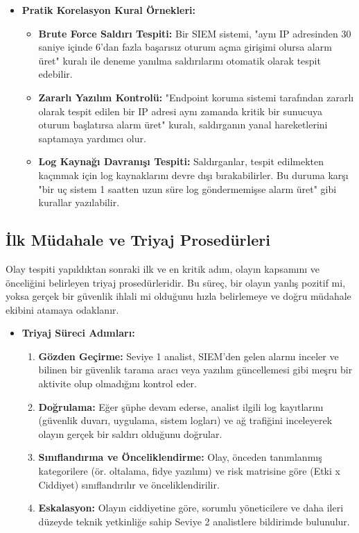 \begin{itemize}
    \item \textbf{Pratik Korelasyon Kural Örnekleri:}
    \begin{itemize}
        \item \textbf{Brute Force Saldırı Tespiti:} Bir SIEM sistemi, "aynı IP adresinden 30 saniye içinde 6'dan fazla başarısız oturum açma girişimi olursa alarm üret" kuralı ile deneme yanılma saldırılarını otomatik olarak tespit edebilir.
        \item \textbf{Zararlı Yazılım Kontrolü:} "Endpoint koruma sistemi tarafından zararlı olarak tespit edilen bir IP adresi aynı zamanda kritik bir sunucuya oturum başlatırsa alarm üret" kuralı, saldırganın yanal hareketlerini saptamaya yardımcı olur.
        \item \textbf{Log Kaynağı Davranışı Tespiti:} Saldırganlar, tespit edilmekten kaçınmak için log kaynaklarını devre dışı bırakabilirler. Bu duruma karşı "bir uç sistem 1 saatten uzun süre log göndermemişse alarm üret" gibi kurallar yazılabilir.
    \end{itemize}
\end{itemize}

\subsection{İlk Müdahale ve Triyaj Prosedürleri}

Olay tespiti yapıldıktan sonraki ilk ve en kritik adım, olayın kapsamını ve önceliğini belirleyen triyaj prosedürleridir. Bu süreç, bir olayın yanlış pozitif mi, yoksa gerçek bir güvenlik ihlali mi olduğunu hızla belirlemeye ve doğru müdahale ekibini atamaya odaklanır.

\begin{itemize}
    \item \textbf{Triyaj Süreci Adımları:}
    \begin{enumerate}
        \item \textbf{Gözden Geçirme:} Seviye 1 analist, SIEM'den gelen alarmı inceler ve bilinen bir güvenlik tarama aracı veya yazılım güncellemesi gibi meşru bir aktivite olup olmadığını kontrol eder.
        \item \textbf{Doğrulama:} Eğer şüphe devam ederse, analist ilgili log kayıtlarını (güvenlik duvarı, uygulama, sistem logları) ve ağ trafiğini inceleyerek olayın gerçek bir saldırı olduğunu doğrular.
        \item \textbf{Sınıflandırma ve Önceliklendirme:} Olay, önceden tanımlanmış kategorilere (ör. oltalama, fidye yazılımı) ve risk matrisine göre (Etki x Ciddiyet) sınıflandırılır ve önceliklendirilir.
        \item \textbf{Eskalasyon:} Olayın ciddiyetine göre, sorumlu yöneticilere ve daha ileri düzeyde teknik yetkinliğe sahip Seviye 2 analistlere bildirimde bulunulur.
    \end{enumerate}
\end{itemize}

